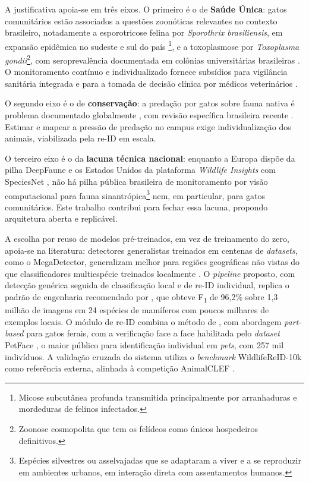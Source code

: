 A justificativa apoia-se em três eixos. O primeiro é o de \textbf{Saúde Única}: gatos comunitários estão associados a questões zoonóticas relevantes no contexto brasileiro, notadamente a esporotricose felina por \textit{Sporothrix brasiliensis}, em expansão epidêmica no sudeste e sul do país \cite{ferreira2026tndrtm,bastos2025sporotrichosis,colombo2024emergence}\footnote{Micose subcutânea profunda transmitida principalmente por arranhaduras e mordeduras de felinos infectados.}, e a toxoplasmose por \textit{Toxoplasma gondii}\footnote{Zoonose cosmopolita que tem os felídeos como únicos hospedeiros definitivos.}, com seroprevalência documentada em colônias universitárias brasileiras \cite{kmetiuk2021toxoplasma,higa2010toxoplasma}. O monitoramento contínuo e individualizado fornece subsídios para vigilância sanitária integrada \cite{ferroglio2024integrated} e para a tomada de decisão clínica por médicos veterinários \cite{santiago2025sporothrix}.


O segundo eixo é o de \textbf{conservação}: a predação por gatos sobre fauna nativa é problema documentado globalmente \cite{loss2013impact,li2021china}, com revisão específica brasileira recente \cite{goncalves2025wildcat}. Estimar e mapear a pressão de predação no campus exige individualização dos animais, viabilizada pela re-ID em escala.


O terceiro eixo é o da \textbf{lacuna técnica nacional}: enquanto a Europa dispõe da pilha DeepFaune \cite{rigoudy2023deepfaune} e os Estados Unidos da plataforma \textit{Wildlife Insights} com SpeciesNet \cite{wildlifeinsights,google_speciesnet_blog}, não há pilha pública brasileira de monitoramento por visão computacional para fauna sinantrópica\footnote{Espécies silvestres ou asselvajadas que se adaptaram a viver e a se reproduzir em ambientes urbanos, em interação direta com assentamentos humanos.} nem, em particular, para gatos comunitários. Este trabalho contribui para fechar essa lacuna, propondo arquitetura aberta e replicável.


A escolha por reuso de modelos pré-treinados, em vez de treinamento do zero, apoia-se na literatura: detectores generalistas treinados em centenas de \textit{datasets}, como o MegaDetector, generalizam melhor para regiões geográficas não vistas do que classificadores multiespécie treinados localmente \cite{schneider2018avss,velez2022choosing}. O \textit{pipeline} proposto, com detecção genérica seguida de classificação local e de re-ID individual, replica o padrão de engenharia recomendado por , que obteve F\textsubscript{1} de 96,2\% sobre 1,3 milhão de imagens em 24 espécies de mamíferos com poucos milhares de exemplos locais. O módulo de re-ID combina o método de , com abordagem \textit{part-based} para gatos ferais, com a verificação face a face habilitada pelo \textit{dataset} PetFace \cite{shinoda2024petface}, o maior público para identificação individual em \textit{pets}, com 257 mil indivíduos. A validação cruzada do sistema utiliza o \textit{benchmark} WildlifeReID-10k \cite{adam2024wildlifereid10k} como referência externa, alinhada à competição AnimalCLEF \cite{animalclef2026}.



